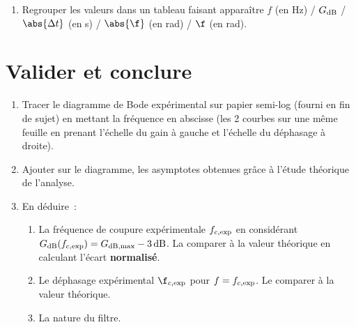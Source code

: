 \documentclass[a4paper, 11pt, final, garamond]{book}
\begin{document}
\begin{enumerate}[label=\sqenumi, start=7]
    \item  Regrouper les valeurs dans un tableau faisant apparaître $f$ (en Hz)
        / $G_{\rm dB}$ / $\abs{\Delta t}$ (en s) / $\abs{\f}$ (en rad) /
        $\f$ (en rad).
\end{enumerate}

\section{Valider et conclure}

\begin{enumerate}[label=\sqenumi, resume]
    \item Tracer le diagramme de Bode expérimental sur papier semi-log (fourni
        en fin de sujet) en mettant la fréquence en abscisse (les 2 courbes sur
        une même feuille en prenant l'échelle du gain à gauche et l'échelle du
        déphasage à droite).
    \item Ajouter sur le diagramme, les asymptotes obtenues grâce à l'étude
        théorique de l'analyse.
    \item En déduire~:
        \begin{enumerate}
            \item La fréquence de coupure expérimentale $f_{c, \rm exp}$ en
                considérant $G_{\rm dB}(f_{c, \rm exp}) = G_{\rm dB, max}
                -\SI{3}{dB}$. La comparer à la valeur théorique en calculant
                l'écart \textbf{normalisé}.
            \item Le déphasage expérimental $\f_{c, \rm exp}$ pour $f=f_{c, \rm
                exp}$. Le comparer à la valeur théorique.
            \item La nature du filtre.
        \end{enumerate}
\end{enumerate}

% 
% 

\newpage

\thispagestyle{empty}


\end{document}
